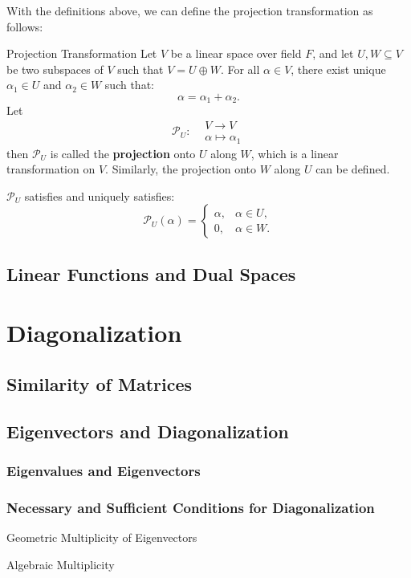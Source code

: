 \documentclass[11pt]{../../TexTemplate/elegantbook} %
\begin{document}
With the definitions above, we can define the projection transformation as follows:
\begin{definition}{Projection Transformation}
    Let \( V \) be a linear space over field \( F \),
    and let \( U, W \subseteq V \) be two subspaces of \( V \) such that \( V = U \oplus W \).
    For all \( \alpha \in V \), there exist unique \( \alpha_1 \in U \) and \( \alpha_2 \in W \) such that:
    \[
    \alpha = \alpha_1 + \alpha_2.
    \]
    Let
    \[ 
        \mathcal{P}_{U}: 
        \begin{aligned}
        &V \to V \\
        &\alpha \mapsto \alpha_1
        \end{aligned}
    \] 
    then \( \mathcal{P}_{U} \) is called the \textbf{projection} onto \( U \) along \( W \),
    which is a linear transformation on \( V \).
    Similarly, the projection onto \( W \) along \( U \) can be defined.
\end{definition}
\( \mathcal{P}_{U}\) satisfies and uniquely satisfies:
\[
\mathcal{P}_{U}( \alpha ) = 
\begin{cases} 
    \alpha, & \alpha \in U, \\ 
    0, & \alpha \in W .
\end{cases}
\]



\section{Linear Functions and Dual Spaces}



\chapter{Diagonalization}
\section{Similarity of Matrices}
\section{Eigenvectors and Diagonalization}
\subsection{Eigenvalues and Eigenvectors}

\subsection{Necessary and Sufficient Conditions for Diagonalization}
\begin{leftbarTitle}{Geometric Multiplicity of Eigenvectors}\end{leftbarTitle}
\begin{leftbarTitle}{Algebraic Multiplicity}\end{leftbarTitle}
\end{document}
